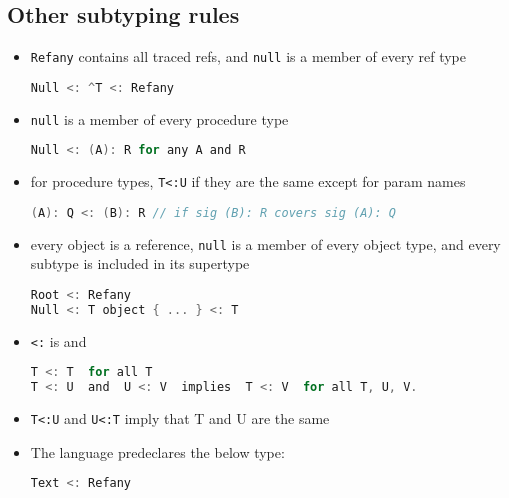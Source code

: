 \documentclass[10pt,a4paper,landscape]{article}
\begin{document}
\begin{multicols*}{3}
\section*{Other subtyping rules}
\begin{itemize}
\item \texttt{Refany} contains all traced refs, and \texttt{null} is a member of every ref type
\begin{lstlisting}[language=c]
Null <: ^T <: Refany
\end{lstlisting}
\item \texttt{null} is a member of every procedure type
\begin{lstlisting}[language=c]
Null <: (A): R for any A and R
\end{lstlisting}
\item for procedure types, \texttt{T<:U} if they are the same except for param names
\begin{lstlisting}[language=c]
(A): Q <: (B): R // if sig (B): R covers sig (A): Q
\end{lstlisting}
\item every object is a reference, \texttt{null} is a member of every object type, and every subtype is included in its supertype
\begin{lstlisting}[language=c]
Root <: Refany
Null <: T object { ... } <: T
\end{lstlisting}
\item \texttt{<:} is  and 
\begin{lstlisting}[language=c]
T <: T  for all T
T <: U  and  U <: V  implies  T <: V  for all T, U, V.
\end{lstlisting}
\item \texttt{T<:U} and \texttt{U<:T}  imply that T and U are the same
\item The language predeclares the below type:
\begin{lstlisting}[language=c]
Text <: Refany
\end{lstlisting}
\end{itemize}

\end{multicols*}
\end{document}
